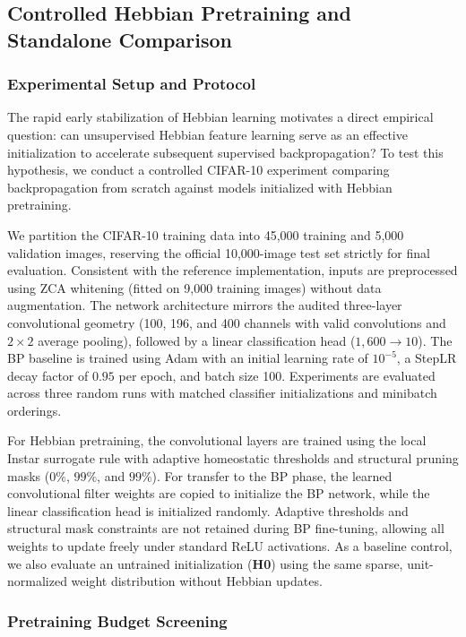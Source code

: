 \documentclass{article}
\begin{document}
    {\color{red}
    \subsection{Controlled Hebbian Pretraining and Standalone Comparison}
    \label{sec:controlled_hybrid}

    \subsubsection{Experimental Setup and Protocol}

    The rapid early stabilization of Hebbian learning motivates a direct empirical question: can unsupervised Hebbian feature learning serve as an effective initialization to accelerate subsequent supervised backpropagation? To test this hypothesis, we conduct a controlled CIFAR-10 experiment comparing backpropagation from scratch against models initialized with Hebbian pretraining.

    We partition the CIFAR-10 training data into 45,000 training and 5,000 validation images, reserving the official 10,000-image test set strictly for final evaluation. Consistent with the reference implementation, inputs are preprocessed using ZCA whitening (fitted on 9,000 training images) without data augmentation. The network architecture mirrors the audited three-layer convolutional geometry (100, 196, and 400 channels with valid convolutions and $2\times2$ average pooling), followed by a linear classification head ($1,600 \to 10$). The BP baseline is trained using Adam with an initial learning rate of $10^{-5}$, a StepLR decay factor of $0.95$ per epoch, and batch size 100. Experiments are evaluated across three random runs with matched classifier initializations and minibatch orderings.

    For Hebbian pretraining, the convolutional layers are trained using the local Instar surrogate rule with adaptive homeostatic thresholds and structural pruning masks ($0\%$, $99\%$, and $99\%$). For transfer to the BP phase, the learned convolutional filter weights are copied to initialize the BP network, while the linear classification head is initialized randomly. Adaptive thresholds and structural mask constraints are not retained during BP fine-tuning, allowing all weights to update freely under standard ReLU activations. As a baseline control, we also evaluate an untrained initialization (\textbf{H0}) using the same sparse, unit-normalized weight distribution without Hebbian updates.

    \subsubsection{Pretraining Budget Screening}

}
\end{document}
